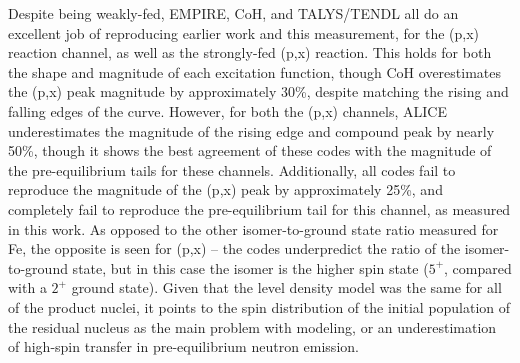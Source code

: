 Despite being weakly-fed, EMPIRE, CoH, and TALYS/TENDL all do an excellent job of reproducing earlier work and this measurement, for the (p,x) reaction channel, as well as the strongly-fed (p,x) reaction.
This holds for both the shape and magnitude of each excitation function, though CoH overestimates the (p,x) peak magnitude by approximately 30\%, despite matching the rising and falling edges of the curve.
However, for both the (p,x) channels, ALICE underestimates the magnitude of the rising edge and compound peak by nearly 50\%, though it shows the best agreement of these codes with the magnitude of the pre-equilibrium tails for these channels.
Additionally, all codes fail to reproduce the magnitude of the (p,x) peak by approximately 25\%, and completely fail to reproduce the pre-equilibrium tail for this channel, as measured in this work. 
As opposed to the other isomer-to-ground state ratio measured for Fe,  the opposite is seen for (p,x) -- the codes underpredict the ratio of the isomer-to-ground state, but in this case the isomer is the higher spin state ($5^+$, compared with a  $2^+$ ground state).
Given that the level density model was the same for all of the product nuclei, it points to the spin distribution of the initial population of the residual nucleus as the main problem with modeling, or an underestimation of high-spin transfer in pre-equilibrium neutron emission.









